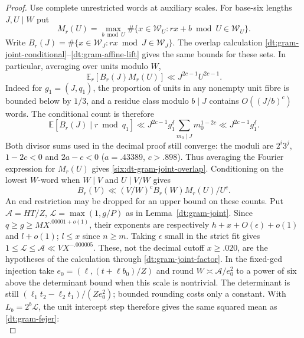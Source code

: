 \documentclass[11pt,a4paper]{article}
\theoremstyle{paperplain}
\numberwithin{equation}{section}
\begin{document}
\begin{proof}
Use complete unrestricted words at auxiliary scales. For
base-six lengths \(J,U\mid W\) put
\[
 M_r(U)=\max_{b\bmod U}\#\{x\in\mathcal W_U:
                                    rx+b\bmod U\in\mathcal W_U\}.
\]
Write $B_r(J)=\#\{x\in\mathcal W_J:rx\bmod J\in\mathcal W_J\}$.
The overlap calculation \eqref{dt:gram-joint-conditional}--\eqref{dt:gram-affine-lift}
gives the same bounds for these sets. In particular, averaging over units modulo $W$,
\begin{equation}
        \mathbb E_r[B_r(J)M_r(U)]\ll J^{2c-1}U^{2c-1}.
 \label{six:dt-gram-joint-overlap}
\end{equation}
Indeed for $g_1=(J,q_1)$, the proportion of units in any nonempty
unit fibre is bounded below by $1/3$, and a residue class modulo
$b\mid J$ contains $O((J/b)^c)$ words. The conditional count is therefore
\begin{equation}
 \mathbb E[B_r(J)\mid r\bmod q_1]\ll
  J^{2c-1}g_1^\delta\sum_{m_0\mid J}m_0^{1-2c}
                       \ll J^{2c-1}g_1^\delta .
 \label{six:dt-gram-joint-conditional}
\end{equation}
Both divisor sums used in the decimal proof still converge: the moduli
are $2^i3^j$, $1-2c<0$ and $2a-c<0$ ($a=.43389$, $c>.898$).
Thus averaging the Fourier expression for $M_r(U)$ gives
\eqref{six:dt-gram-joint-overlap}. Conditioning on the lowest $W$-word
when $W\mid V$ and $U\mid V/W$ gives
\begin{equation}
          B_r(V)\ll (V/W)^c B_r(W)M_r(U)/U^c .
 \label{six:dt-gram-affine-lift}
\end{equation}
An end restriction may be dropped for an upper bound on these counts.
Put $\mathcal A=HT/Z$, $\mathcal L=\max(1,g/P)$ as in Lemma~\ref{dt:gram-joint}.
Since $q\ge g\ge MX^{.00001+o(1)}$, their exponents are respectively
$h+x+O(\epsilon)+o(1)$ and $l+o(1)$; $l\le x$ since $n\ge m$.
Taking $\epsilon$ small in the strict fit gives $1\le\mathcal L\le\mathcal A\ll V X^{-.000005}$.
These, not the decimal cutoff $x\ge .020$, are the hypotheses of the
calculation through \eqref{dt:gram-joint-factor}. In the fixed-gcd
injection take $e_0=(\ell,(t+\ell b_0)/Z)$ and round $W\asymp\mathcal A/e_0^2$
to a power of six above the determinant bound when this scale is nontrivial.
The determinant is still $(\ell_1t_2-\ell_2t_1)/(Ze_0^2)$; bounded rounding
costs only a constant. With $L_b=2^b\mathcal L$, the unit intercept step
therefore gives the same squared mean as \eqref{dt:gram-fejer}:
\begin{equation}

\end{equation}
\end{proof}
\end{document}
